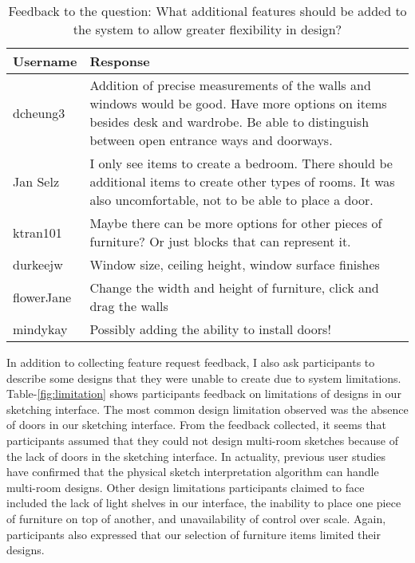 \begin{table}[!ht]
\centering
\begin{tabular}{|p{}|p{}|}
\hline
\rowcolor[HTML]{EFEFEF} 
Username   & Response                                                                                                                                                                                       \\ \hline
dcheung3   & Addition of precise measurements of the walls and windows would be good. Have more options on items besides desk and wardrobe. Be able to distinguish between open entrance ways and doorways. \\ \hline
Jan Selz   & I only see items to create a bedroom.  There should be additional items to create other types of rooms.  It was also uncomfortable, not to be able to place a door.                            \\ \hline
ktran101   & Maybe there can be more options for other pieces of furniture? Or just blocks that can represent it.                                                                                           \\ \hline
durkeejw   & Window size, ceiling height, window surface finishes                                                                                                                                           \\ \hline
flowerJane & Change the width and height of furniture, click and drag the walls                                                                                                                             \\ \hline
mindykay   & Possibly adding the ability to install doors!                                                                                                                                                  \\ \hline
\end{tabular}
\caption{Feedback to the question: What additional features should be added to the system to allow greater flexibility in design?}
\label{fig:features}
\end{table}


In addition to collecting feature request feedback, I also ask participants to describe some designs that they were unable to create due to system limitations.
Table-\ref{fig:limitation} shows participants feedback on limitations of designs in our sketching interface.
The most common design limitation observed was the absence of doors in our sketching interface.
From the feedback collected, it seems that participants assumed that they could not design multi-room sketches because of the lack of doors in the sketching interface.
In actuality, previous user studies have confirmed that the physical sketch interpretation algorithm can handle multi-room designs.
Other design limitations participants claimed to face included the lack of light shelves in our interface, the inability to place one piece of furniture on top of another, and unavailability of control over scale.
Again, participants also expressed that our selection of furniture items limited their designs. \\

